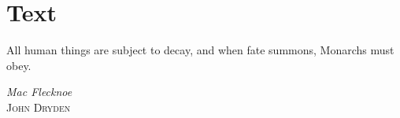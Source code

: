 \chapter{Text}
\label{ch:ch2}

\begin{singlespace} %
	\epigraph{All human things are subject to decay, and when fate summons, Monarchs must obey.}{\textit{Mac Flecknoe} \\ \textsc{John Dryden}}
\end{singlespace}

\lipsum[6]